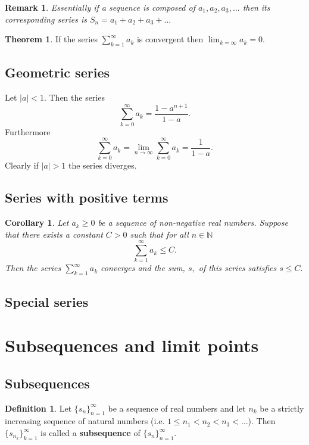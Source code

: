 \documentclass[12pt, a4paper]{article}
\newcommand{\bb}[1]{\mathbb{#1}}
\newcommand{\f}[2]{\frac{#1}{#2}}
\newtheorem*{remark}{Remark}
\theoremstyle{definition}
\newtheorem{definition}{Definition}[section]
\newtheorem{theorem}{Theorem}[section]
\theoremstyle{plain}
\newtheorem{corollary}{Corollary}[theorem]
\begin{document}
\begin{remark}
Essentially if a sequence is composed of $a_1,a_2,a_3,\ldots$ then its corresponding series is $S_n=a_1+a_2+a_3+\ldots$
\end{remark}

\begin{theorem}
If the series $\sum_{k=1}^{\infty} a_k$ is convergent then $\lim_{k=\infty} a_k =0.$
\end{theorem}

\subsection{Geometric series}

Let $|a|<1.$ Then the series $$\sum_{k=0}^{\infty} a_k = \f{1-a^{n+1}}{1-a}.$$ Furthermore $$\sum_{k=0}^{\infty} a_k =\lim_{n\to\infty} \sum_{k=0}^{\infty} a_k =\f{1}{1-a}.$$ Clearly if $|a|>1$ the series diverges.

\subsection{Series with positive terms}

\begin{corollary}
Let $a_k \geq 0$ be a sequence of non-negative real numbers. Suppose that there exists a constant $C>0$ such that for all $n\in \bb{N}$ $$\sum_{k=1}^{\infty} a_k\leq C.$$ Then the series $\sum_{k=1}^{\infty} a_k$ converges and the sum, $s,$ of this series satisfies $s\leq C.$
\end{corollary}

\subsection{Special series}



\section{Subsequences and limit points}

\subsection{Subsequences}

\begin{definition}
Let $\{s_n\}_{n=1}^{\infty}$ be a sequence of real numbers and let $n_k$ be a strictly increasing sequence of natural numbers (i.e. $1 \leq n_1 < n_2 < n_3 < \ldots$). Then $\{s_{n_k}\}_{k=1}^{\infty}$ is called a \textbf{subsequence} of $\{s_n\}_{n=1}^{\infty}.$
\end{definition}
\end{document}
